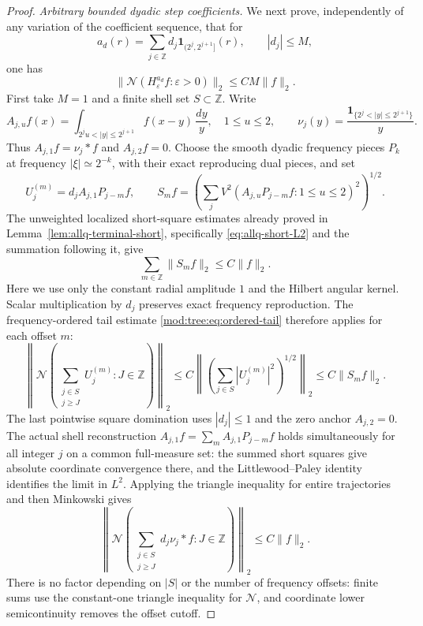 \documentclass[11pt]{article}
\numberwithin{equation}{section}
\theoremstyle{remark}
\theoremstyle{definition}
\newcommand{\NN}{\mathcal N}
\begin{document}
\begin{proof}
\emph{Arbitrary bounded dyadic step coefficients.}
We next prove, independently of any variation of the coefficient
sequence, that for
\[
 a_d(r)=\sum_{j\in\mathbb Z}d_j\mathbf1_{(2^j,2^{j+1}]}(r),
 \qquad |d_j|\le M,
\]
one has
\begin{equation}\label{eq:hilbert-step-continuum}
 \|\NN(H^{a_d}_\varepsilon f:\varepsilon>0)\|_2
 \le C M\|f\|_2.
\end{equation}
First take $M=1$ and a finite shell set $S\subset\mathbb Z$. Write
\begin{equation}\label{eq:hilbert-shell-kernel}
 A_{j,u}f(x)=\int_{2^ju<|y|\le2^{j+1}}f(x-y)\,\frac{dy}{y},
 \quad 1\le u\le2,\qquad
 \nu_j(y)=\frac{\mathbf1_{\{2^j<|y|\le2^{j+1}\}}}{y}.
\end{equation}
Thus $A_{j,1}f=\nu_j*f$ and $A_{j,2}f=0$. Choose the smooth dyadic
frequency pieces $P_k$ at frequency $|\xi|\simeq2^{-k}$, with their
exact reproducing dual pieces, and set
\[
 U_j^{(m)}=d_j A_{j,1}P_{j-m}f,\qquad
 S_mf=\left(\sum_j
 V^2(A_{j,u}P_{j-m}f:1\le u\le2)^2\right)^{1/2}.
\]
The unweighted localized short-square estimates already proved in
Lemma~\ref{lem:allq-terminal-short}, specifically
\eqref{eq:allq-short-L2} and the summation following it, give
\[
 \sum_{m\in\mathbb Z}\|S_mf\|_2\le C\|f\|_2.
\]
Here we use only the constant radial amplitude $1$ and the Hilbert
angular kernel. Scalar multiplication by $d_j$ preserves exact
frequency reproduction. The frequency-ordered tail estimate
\eqref{mod:tree:eq:ordered-tail} therefore applies for each offset $m$:
\[
 \left\|\NN\left(\sum_{\substack{j\in S\\j\ge J}}
 U_j^{(m)}:J\in\mathbb Z\right)\right\|_2
 \le C\left\|\left(\sum_{j\in S}|U_j^{(m)}|^2\right)^{1/2}\right\|_2
 \le C\|S_mf\|_2.
\]
The last pointwise square domination uses $|d_j|\le1$ and the zero
anchor $A_{j,2}=0$. The actual shell reconstruction
$A_{j,1}f=\sum_m A_{j,1}P_{j-m}f$ holds simultaneously for all integer
$j$ on a common full-measure set: the summed short squares give
absolute coordinate convergence there, and the Littlewood--Paley
identity identifies the limit in $L^2$. Applying the triangle
inequality for entire trajectories and then Minkowski gives
\begin{equation}\label{eq:hilbert-dyadic-jump}
 \left\|\NN\left(\sum_{\substack{j\in S\\j\ge J}}
 d_j\nu_j*f:J\in\mathbb Z\right)\right\|_2
 \le C\|f\|_2.
\end{equation}
There is no factor depending on $|S|$ or the number of frequency
offsets: finite sums use the constant-one triangle inequality for
$\NN$, and coordinate lower semicontinuity removes the offset cutoff.


\end{proof}
\end{document}
